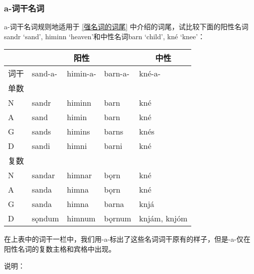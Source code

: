 \subsubsection{a-词干名词}

a-词干名词规则地适用于 \ref{强名词的词尾} 中介绍的词尾，试比较下面的阳性名词sandr
`sand', himinn `heaven'和中性名词barn `child', kné `knee'：

\begin{longtable}{lllll}
  \toprule
     & \multicolumn{3}{c}{\textbf{阳性}} & \multicolumn{1}{c}{\textbf{中性}}                          \\
  \midrule
  \endhead
  \bottomrule
  \endfoot
  词干 & sand-a-                         & himin-a-                        & barn-a- & kné-a-       \\
  单数 &                                 &                                 &         &              \\
  N  & sandr                           & himinn                          & barn    & kné          \\
  A  & sand                            & himin                           & barn    & kné          \\
  G  & sands                           & himins                          & barns   & knés         \\
  D  & sandi                           & himni                           & barni   & kné          \\
  复数 &                                 &                                 &         &              \\
  N  & sandar                          & himnar                          & bǫrn    & kné          \\
  A  & sanda                           & himna                           & bǫrn    & kné          \\
  G  & sanda                           & himna                           & barna   & knjá         \\
  D  & sǫndum                          & himnum                          & bǫrnum  & knjám, knjóm \\
\end{longtable}

在上表中的词干一栏中，我们用-a-标出了这些名词词干原有的样子，但是-a-仅在阳性名词的复数主格和宾格中出现。

说明：


